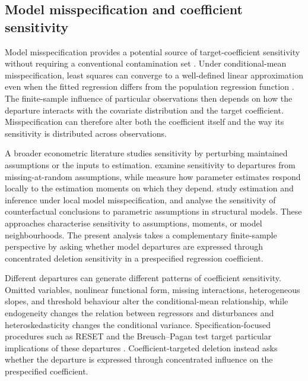 \documentclass[../main.tex]{subfiles}
\begin{document}
\subsection{Model misspecification and coefficient sensitivity}
\label{subsec:model_misspecification}

Model misspecification provides a potential source of target-coefficient sensitivity without requiring a conventional contamination set \parencite{bonhomme2022minimizing}. Under conditional-mean misspecification, least squares can converge to a well-defined linear approximation even when the fitted regression differs from the population regression function \parencite{white1980using}. The finite-sample influence of particular observations then depends on how the departure interacts with the covariate distribution and the target coefficient. Misspecification can therefore alter both the coefficient itself and the way its sensitivity is distributed across observations.

A broader econometric literature studies sensitivity by perturbing maintained assumptions or the inputs to estimation. \textcite{kline2013sensitivity} examine sensitivity to departures from missing-at-random assumptions, while \textcite{andrews2017measuring} measure how parameter estimates respond locally to the estimation moments on which they depend. \textcite{bonhomme2022minimizing} study estimation and inference under local model misspecification, and \textcite{christensen2023counterfactual} analyse the sensitivity of counterfactual conclusions to parametric assumptions in structural models. These approaches characterise sensitivity to assumptions, moments, or model neighbourhoods. The present analysis takes a complementary finite-sample perspective by asking whether model departures are expressed through concentrated deletion sensitivity in a prespecified regression coefficient.

Different departures can generate different patterns of coefficient sensitivity. Omitted variables, nonlinear functional form, missing interactions, heterogeneous slopes, and threshold behaviour alter the conditional-mean relationship, while endogeneity changes the relation between regressors and disturbances and heteroskedasticity changes the conditional variance. Specification-focused procedures such as RESET and the Breusch--Pagan test target particular implications of these departures \parencite{ramsey1969tests,breusch1979simple}. Coefficient-targeted deletion instead asks whether the departure is expressed through concentrated influence on the prespecified coefficient.
\end{document}
